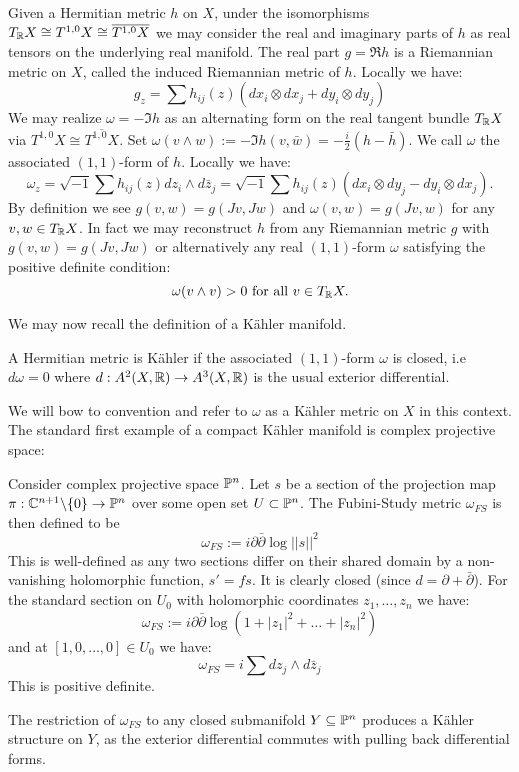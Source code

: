 Given a Hermitian metric \(h\) on \(X\), under the isomorphisms \(T_{\mathbb{R}} X \cong T^{1,0}X \cong \overline{T^{1,0}X}\) we may consider the real and imaginary parts of \(h\) as real tensors on the underlying real manifold. The real part \(g = \Re h\) is a Riemannian metric on \(X\), called the induced Riemannian metric of \(h\). Locally we have:
\[
g_z = \sum h_{ij}(z) ( dx_i \otimes d x_j + dy_i \otimes dy_j)
\]
We may realize \(\omega = - \Im h\) as an alternating form on the real tangent bundle \(T_{\mathbb{R}} X\) via \(T^{1,0}X \cong \overline{T^{1,0}X}\). Set \(\omega ( v \wedge w ) :=  - \Im h(v, \bar{w}) = - \frac{i}{2} ( h - \bar{h} )  \). We call \(\omega\) the associated \((1,1)\)-form of \(h\). Locally we have:
\[
\omega_z = \sqrt{-1} \sum h_{ij}(z) dz_i \wedge d\bar{z}_j = \sqrt{-1} \sum h_{ij}(z) ( dx_i \otimes dy_j - dy_i \otimes dx_j). 
\]
By definition we see \(g(v,w) = g(Jv,Jw)\) and \(\omega(v,w) = g(Jv,w) \) for any \(v,w \in T_{\mathbb{R}} X\). In fact we may reconstruct \(h\) from any Riemannian metric \(g\) with \(g(v,w) = g(Jv,Jw)\) or alternatively any real \((1,1)\)-form \(\omega\) satisfying the positive definite condition:
\[
\omega( v \wedge v)  > 0 \text{ for all } v \in T_{\mathbb{R}} X.
\]

We may now recall the definition of a K\"ahler manifold.
\begin{definition}
A Hermitian metric is K\"ahler if the associated \((1,1)\)-form \(\omega\) is closed, i.e \(d \omega = 0\) where \(d: A^2(X,\mathbb{R}) \to A^3(X,\mathbb{R})\) is the usual exterior differential.
\end{definition}
We will bow to convention and refer to \(\omega\) as a K\"ahler metric on \(X\) in this context. The standard first example of a compact K\"ahler manifold is complex projective space:
\begin{example}
Consider complex projective space \(\mathbb{P}^n\). Let \(s\) be a section of the projection map \(\pi: \mathbb{C}^{n+1} \backslash \{0\} \to \mathbb{P}^n\) over some open set \(U \subset \mathbb{P}^n\). The Fubini-Study metric \(\omega_{FS}\) is then defined to be
\[
\omega_{FS} := i \partial \bar{\partial} \log  ||s||^2
\]
This is well-defined as any two sections differ on their shared domain by a non-vanishing holomorphic function, \(s' = fs\). It is clearly closed (since \(d = \partial + \bar{\partial}\)). For the standard section on \(U_0\) with holomorphic coordinates \(z_1,\dots,z_n\) we have:
\[
\omega_{FS} := i \partial \bar{\partial} \log ( 1 + |z_1|^2 + \dots + |z_n|^2)
\]
and at \([1,0,\dots,0] \in U_0\) we have:
\[
\omega_{FS} = i \sum dz_j \wedge d \bar{z}_j
\]
This is positive definite.
\end{example}
\begin{example}
The restriction of \(\omega_{FS}\) to any closed submanifold \(Y \subseteq \mathbb{P}^n\) produces a K\"ahler structure on \(Y\), as the exterior differential commutes with pulling back differential forms.
\end{example}
